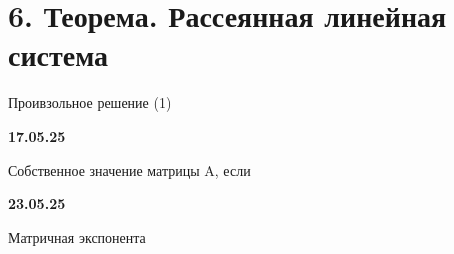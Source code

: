 \documentclass{article}
\begin{document}
\section{6. Теорема. Рассеянная линейная система}


Проивзольное решение (1)



\vspace{5mm}

\textbf{17.05.25}


Собственное значение матрицы A, если 


\vspace{5mm}

\textbf{23.05.25}

Матричная экспонента
\end{document}
